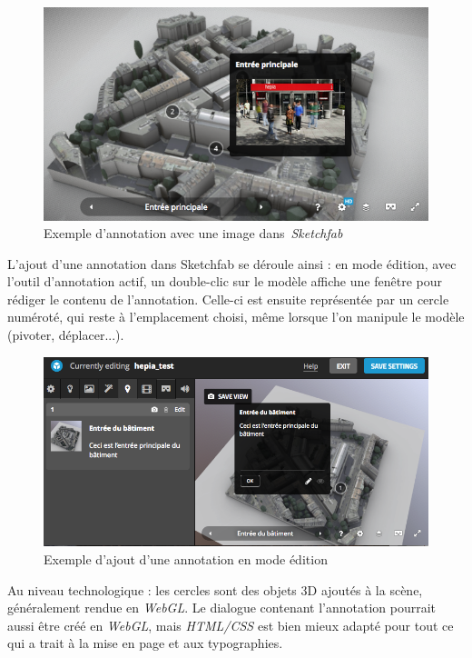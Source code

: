 \begin{figure}
    \centering
    \includegraphics[width=\linewidth]{Figures/sketchfab-annotation-with-picture.png}
    \caption{Exemple d'annotation avec une image dans~\textit{Sketchfab}}
    \label{fig:sketchfab-annotation-with-picture}
\end{figure}

L'ajout d'une annotation dans Sketchfab se déroule ainsi : en mode édition, avec l'outil d'annotation actif, un double-clic sur le modèle affiche une fenêtre pour rédiger le contenu de l'annotation. Celle-ci est ensuite représentée par un cercle numéroté, qui reste à l'emplacement choisi, même lorsque l'on manipule le modèle (pivoter, déplacer...). 

\begin{figure}
    \centering
    \includegraphics{Figures/sketchfab-adding-annotation.png}
    \caption{Exemple d'ajout d'une annotation en mode édition}
    \label{fig:sketchfab-adding-annotation}
\end{figure}

Au niveau technologique : les cercles sont des objets 3D ajoutés à la scène, généralement rendue en \textit{WebGL}. Le dialogue contenant l'annotation pourrait aussi être créé en \textit{WebGL}, mais \textit{HTML/CSS}  est bien mieux adapté pour tout ce qui a trait à la mise en page et aux typographies.

